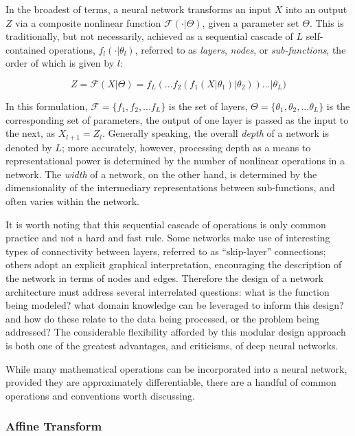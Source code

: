 In the broadest of terms, a neural network transforms an input $X$ into an output $Z$ via a composite nonlinear function $\mathcal{F}(\cdot \vert \Theta)$, given a parameter set $\Theta$.
This is traditionally, but not necessarily, achieved as a sequential cascade of $L$ self-contained operations, $f_l(\cdot \vert \theta_l)$, referred to as \emph{layers}, \emph{nodes}, or \emph{sub-functions}, the order of which is given by $l$:

\begin{equation}
\label{eq:layers}
Z = \mathcal{F}(X \vert \Theta) = f_{L}(  ... f_2(f_1(X \vert \theta_1) \vert \theta_2) ) ... \vert \theta_{L})
\end{equation}

\noindent In this formulation, $\mathcal{F} = \{f_1, f_2, ... f_{L} \}$ is the set of layers, $\Theta = \{\theta_1, \theta_2, ... \theta_{L} \}$ is the corresponding set of parameters, the output of one layer is passed as the input to the next, as $X_{l+1} = Z_{l}$.
Generally speaking, the overall \emph{depth} of a network is denoted by $L$;
more accurately, however, processing depth as a means to representational power is determined by the number of nonlinear operations in a network.
The \emph{width} of a network, on the other hand, is determined by the dimensionality of the intermediary representations between sub-functions, and often varies within the network.

It is worth noting that this sequential cascade of operations is only common practice and not a hard and fast rule.
Some networks make use of interesting types of connectivity between layers, referred to as ``skip-layer'' connections;
others adopt an explicit graphical interpretation, encouraging the description of the network in terms of nodes and edges.
Therefore the design of a network architecture must address several interrelated questions:
what is the function being modeled?
what domain knowledge can be leveraged to inform this design?
and how do these relate to the data being processed, or the problem being addressed?
The considerable flexibility afforded by this modular design approach is both one of the greatest advantages, and criticisms, of deep neural networks.

While many mathematical operations can be incorporated into a neural network, provided they are approximately differentiable, there are a handful of common operations and conventions worth discussing.

\subsubsection{Affine Transform}

